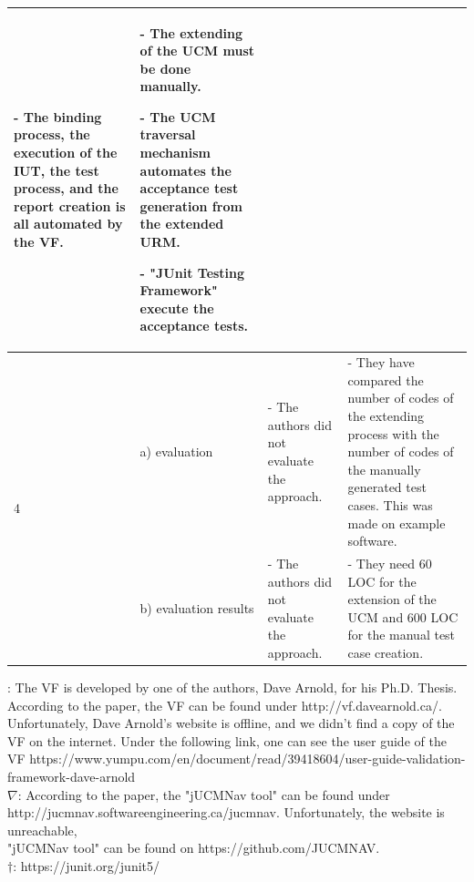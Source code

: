 \begin{landscape}
\begin{table}
\begin{longtable}[h]{|p{1.3cm}|>{\raggedright}p{2.6cm}|>{}p{9.2cm}|>{}p{9.2cm}|}
			- The binding process, the execution of the IUT, the test process, and the report creation is all automated by the VF.
			& 
			- The extending of the UCM must be done manually.
			
			- The UCM traversal mechanism automates the acceptance test generation from the extended URM.
			
			- "JUnit Testing Framework" execute the acceptance tests.
			\\
			\cline{2-4}
			\hline %
			\multirow{2}{*}{4 \rotatebox[origin=r]{90}{\textbf{Quality}}} 
			& a) evaluation
			& - The authors did not evaluate the approach. 
			& - They have compared the number of codes of the extending process with the number of codes of the manually generated test cases. This was made on example software. 
			\\
			\cline{2-4}
			& b) evaluation results 
			&- The authors did not evaluate the approach. &
			- They need 60 LOC for the extension of the UCM and 600 LOC for the manual test case creation. \\
			\cline{2-4}
			\hline %
		\end{longtable}
		\qquad \qquad *: The VF is developed by one of the authors, Dave Arnold, for his Ph.D. Thesis. According to the paper, the VF can be found under http://vf.davearnold.ca/.\\
		\null \qquad \qquad \quad Unfortunately, Dave Arnold's website is offline, and we didn't find a copy of the VF on the internet. Under the following link, one can see the user guide of the \\
		\null \qquad \qquad \quad VF https://www.yumpu.com/en/document/read/39418604/user-guide-validation-framework-dave-arnold \\
		\null \qquad \qquad $\nabla$: According to the paper, the "jUCMNav tool" can be found under http://jucmnav.softwareengineering.ca/jucmnav. Unfortunately, the website is unreachable, \\
		\null \qquad \qquad \quad "jUCMNav tool" can be found on https://github.com/JUCMNAV.\\
		\null \qquad \qquad $\dagger$: https://junit.org/junit5/
		\label{tab:08_syntheseMatrix2}
	\end{table}
	
\end{landscape}
\restoregeometry
